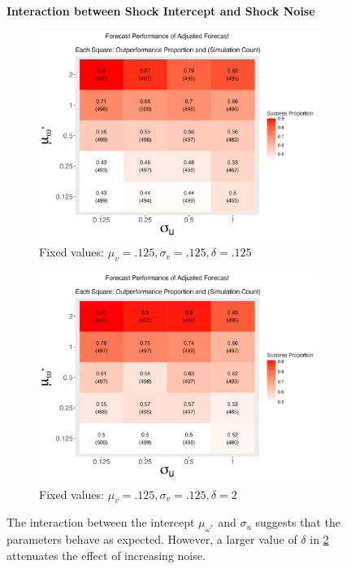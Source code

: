 \documentclass[11pt,3p,review,authoryear]{elsarticle}
\theoremstyle{definition}
\begin{document}
\begin{figure}[!h]
  \centering
  \textbf{Interaction between Shock Intercept and Shock Noise}\par\medskip
\begin{subfigure}{.44\linewidth} 
  \centering
    \includegraphics[scale = .42]{simulation_plots/Aug28_224451_2024_mu[omega^*]_sigma[u].png}
    \caption{Fixed values: $\mu_{v} = .125, \sigma_{v} = .125, \delta = .125$}\label{fig:sim_6}
\end{subfigure}\hspace{12mm} %
\begin{subfigure}{.44\linewidth} 
  \centering
    \includegraphics[scale=.42]{simulation_plots/Aug28_224455_2024_mu[omega^*]_sigma[u].png}
    \caption{Fixed values: $\mu_{v} = .125, \sigma_{v} = .125, \delta = 2$}\label{fig:sim_7}
\end{subfigure}

    \caption{The interaction between the intercept $\mu_{\omega^{*}}$ and $\sigma_{u}$ suggests that the parameters behave as expected.  However, a larger value of $\delta$ in \ref{fig:sim_7} attenuates the effect of increasing noise.}
    \label{fig:intercept_noise}
  \end{figure}
\end{document}
